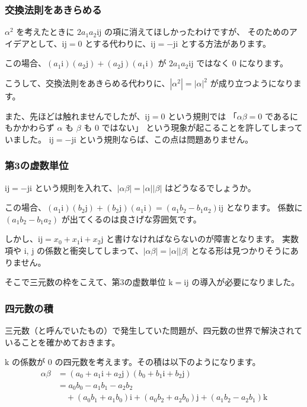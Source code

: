 \documentclass{beamer}
\newcommand{\ii}{\mathrm{i}}
\newcommand{\jj}{\mathrm{j}}
\newcommand{\kk}{\mathrm{k}}
\begin{document}
\begin{frame}
    \frametitle{交換法則をあきらめる}

    \(\alpha^2\) を考えたときに \(2 a_1 a_2 \ii \jj\) の項に消えてほしかったわけですが、
    そのためのアイデアとして、\(\ii \jj = 0\) とする代わりに、\(\ii \jj = - \jj \ii\) とする方法があります。

    この場合、\((a_1 \ii)(a_2 \jj) + (a_2 \jj)(a_1 \ii)\) が \(2 a_1 a_2 \ii \jj\) ではなく \(0\) になります。

    \bigskip

    こうして、交換法則をあきらめる代わりに、\(|\alpha^2| = |\alpha|^2\) が成り立つようになります。

    \bigskip

    また、先ほどは触れませんでしたが、\(\ii \jj = 0\) という規則では
    「\(\alpha \beta = 0\) であるにもかかわらず \(\alpha\) も \(\beta\) も \(0\) ではない」
    という現象が起こることを許してしまっていました。
    \(\ii \jj = - \jj \ii\) という規則ならば、この点は問題ありません。
\end{frame}

\begin{frame}
    \frametitle{第3の虚数単位}

    \(\ii \jj = - \jj \ii\) という規則を入れて、\(|\alpha \beta| = |\alpha| |\beta|\) はどうなるでしょうか。

    \bigskip

    この場合、\((a_1 \ii)(b_2 \jj) + (b_2 \jj)(a_1 \ii) = (a_1 b_2 - b_1 a_2)\ii \jj\) となります。
    係数に \((a_1 b_2 - b_1 a_2)\) が出てくるのは良さげな雰囲気です。

    しかし、\(\ii \jj = x_0 + x_1 \ii + x_2 \jj\) と書けなければならないのが障害となります。
    実数項や \(\ii\), \(\jj\) の係数と衝突してしまって、\(|\alpha \beta| = |\alpha| |\beta|\) となる形は見つかりそうにありません。

    \bigskip

    そこで三元数の枠をこえて、第3の虚数単位 \(\kk = \ii \jj\) の導入が必要になりました。
\end{frame}

\begin{frame}
    \frametitle{四元数の積}

    三元数（と呼んでいたもの）で発生していた問題が、四元数の世界で解決されていることを確かめておきます。

    \bigskip

    \(\kk\) の係数が \(0\) の四元数を考えます。その積は以下のようになります。
    \begin{align*}
        \alpha \beta & = (a_0 + a_1 \ii + a_2 \jj) (b_0 + b_1 \ii + b_2 \jj)                               \\
                     & = a_0 b_0 - a_1 b_1 - a_2 b_2                                                       \\
                     & \quad + (a_0 b_1 + a_1 b_0) \ii + (a_0 b_2 + a_2 b_0) \jj + (a_1 b_2 - a_2 b_1) \kk
    \end{align*}
\end{frame}
\end{document}
